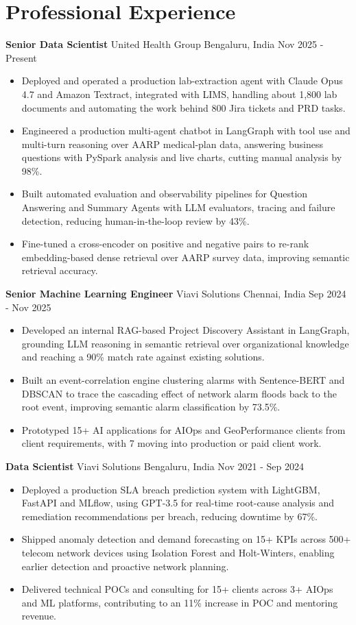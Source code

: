 \documentclass[10pt,a4paper]{article}
\newcommand{\role}[4]{\textbf{#1} \textbar{} #2 \hfill #3 \textbar{} #4\par}
\begin{document}
\section{Professional Experience}
\role{Senior Data Scientist}{United Health Group}{Bengaluru, India}{Nov 2025 - Present}
\begin{itemize}
  \item Deployed and operated a production lab-extraction agent with Claude Opus 4.7 and Amazon Textract, integrated with LIMS, handling about 1,800 lab documents and automating the work behind 800 Jira tickets and PRD tasks.
  \item Engineered a production multi-agent chatbot in LangGraph with tool use and multi-turn reasoning over AARP medical-plan data, answering business questions with PySpark analysis and live charts, cutting manual analysis by 98\%.
  \item Built automated evaluation and observability pipelines for Question Answering and Summary Agents with LLM evaluators, tracing and failure detection, reducing human-in-the-loop review by 43\%.
  \item Fine-tuned a cross-encoder on positive and negative pairs to re-rank embedding-based dense retrieval over AARP survey data, improving semantic retrieval accuracy.
\end{itemize}
\vspace{3pt}
\role{Senior Machine Learning Engineer}{Viavi Solutions}{Chennai, India}{Sep 2024 - Nov 2025}
\begin{itemize}
  \item Developed an internal RAG-based Project Discovery Assistant in LangGraph, grounding LLM reasoning in semantic retrieval over organizational knowledge and reaching a 90\% match rate against existing solutions.
  \item Built an event-correlation engine clustering alarms with Sentence-BERT and DBSCAN to trace the cascading effect of network alarm floods back to the root event, improving semantic alarm classification by 73.5\%.
  \item Prototyped 15+ AI applications for AIOps and GeoPerformance clients from client requirements, with 7 moving into production or paid client work.
\end{itemize}
\vspace{3pt}
\role{Data Scientist}{Viavi Solutions}{Bengaluru, India}{Nov 2021 - Sep 2024}
\begin{itemize}
  \item Deployed a production SLA breach prediction system with LightGBM, FastAPI and MLflow, using GPT-3.5 for real-time root-cause analysis and remediation recommendations per breach, reducing downtime by 67\%.
  \item Shipped anomaly detection and demand forecasting on 15+ KPIs across 500+ telecom network devices using Isolation Forest and Holt-Winters, enabling earlier detection and proactive network planning.
  \item Delivered technical POCs and consulting for 15+ clients across 3+ AIOps and ML platforms, contributing to an 11\% increase in POC and mentoring revenue.
\end{itemize}
\end{document}
